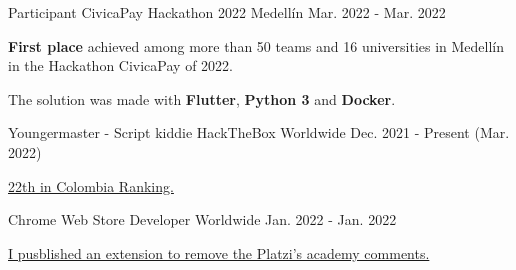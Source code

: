 
\begin{cventries}

  \cventry
    {Participant} %
    {CivicaPay Hackathon 2022} %
    {Medellín} %
    {Mar. 2022 - Mar. 2022} %
    {
      \begin{cvitems} %
        \item {\textbf{First place} achieved among more than 50 teams and 16 universities in 
        Medellín in the Hackathon CivicaPay of 2022.}
        \item {The solution was made with \textbf{Flutter}, \textbf{Python 3} and \textbf{Docker}.}
      \end{cvitems}
    }

  \cventry
    {Youngermaster - Script kiddie} %
    {HackTheBox} %
    {Worldwide} %
    {Dec. 2021 - Present (Mar. 2022)} %
    {
      \begin{cvitems} %
        \item {\href{https://app.hackthebox.com/rankings/country/CO}{22th in Colombia Ranking.}}
      \end{cvitems}
    }

  \cventry
    {Chrome Web Store} %
    {Developer} %
    {Worldwide} %
    {Jan. 2022 - Jan. 2022} %
    {
      \begin{cvitems} %
        \item {\href{https://chrome.google.com/webstore/detail/platzi-community-wrapper/dakgbbfpefoofghfbkopnbnpadeblbep}
        {I pusblished an extension to remove the Platzi's academy comments.}}
      \end{cvitems}
    }



\end{cventries}
